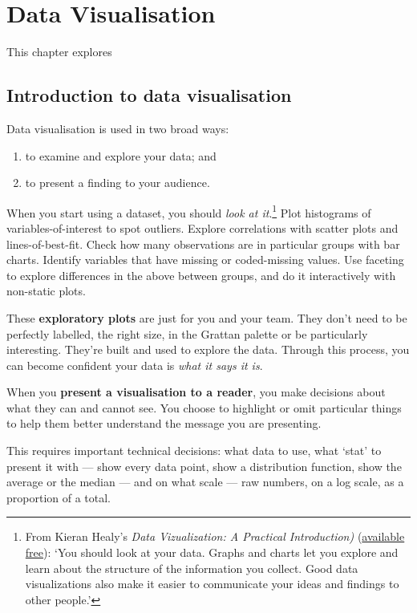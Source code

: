 \documentclass[]{book}
\providecommand{\tightlist}{%
  \setlength{\itemsep}{0pt}\setlength{\parskip}{0pt}}
\let\rmarkdownfootnote\footnote%
\def\footnote{\protect\rmarkdownfootnote}
\begin{document}
\hypertarget{data-visualisation}{%
\chapter{Data Visualisation}\label{data-visualisation}}

This chapter explores

\hypertarget{introduction-to-data-visualisation}{%
\section{Introduction to data visualisation}\label{introduction-to-data-visualisation}}

Data visualisation is used in two broad ways:

\begin{enumerate}
\def\labelenumi{\arabic{enumi}.}
\tightlist
\item
  to examine and explore your data; and
\item
  to present a finding to your audience.
\end{enumerate}

When you start using a dataset, you should \emph{look at it}.\footnote{From Kieran Healy's \emph{Data Vizualization: A Practical Introduction)} (\href{https://socviz.co/}{available free}): `You should look at your data. Graphs and charts let you explore and learn about the structure of the information you collect. Good data visualizations also make it easier to communicate your ideas and findings to other people.'} Plot histograms of variables-of-interest to spot outliers. Explore correlations with scatter plots and lines-of-best-fit. Check how many observations are in particular groups with bar charts. Identify variables that have missing or coded-missing values. Use faceting to explore differences in the above between groups, and do it interactively with non-static plots.

These \textbf{exploratory plots} are just for you and your team. They don't need to be perfectly labelled, the right size, in the Grattan palette or be particularly interesting.
They're built and used to explore the data.
Through this process, you can become confident your data is \emph{what it says it is}.

When you \textbf{present a visualisation to a reader}, you make decisions about what they can and cannot see. You choose to highlight or omit particular things to help them better understand the message you are presenting.

This requires important technical decisions: what data to use, what `stat' to present it with --- show every data point, show a distribution function, show the average or the median --- and on what scale --- raw numbers, on a log scale, as a proportion of a total.
\end{document}
